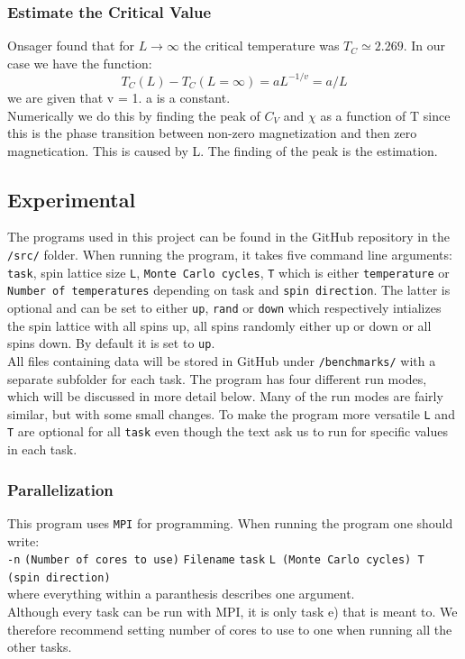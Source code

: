 \documentclass{article}
\begin{document}
\subsubsection*{Estimate the Critical Value}
Onsager found that for $L \rightarrow \infty$ the critical temperature was $T_C \simeq 2.269$. In our case we have the function:
\begin{equation}
T_C(L) - T_C(L = \infty) = aL^{-1/v} = a/L
\end{equation}
we are given that v = 1. a is a constant. \\
Numerically we do this by finding the peak of $C_V$ and $\chi$ as a function of T since this is the phase transition between non-zero magnetization and then zero magnetication. This is caused by L. The finding of the peak is the estimation.
\subsection*{Experimental}
The programs used in this project can be found in the GitHub repository \cite{github} in the \texttt{/src/} folder. When running the program, it takes five command line arguments: \texttt{task}, spin lattice size \texttt{L}, \texttt{Monte Carlo cycles}, \texttt{T} which is either \texttt{temperature} or \texttt{Number of temperatures} depending on task and \texttt{spin direction}. The latter is optional and can be set to either \texttt{up}, \texttt{rand} or \texttt{down} which respectively intializes the spin lattice with all spins up, all spins randomly either up or down or all spins down. By default it is set to \texttt{up}. \\
All files containing data will be stored in GitHub under \texttt{/benchmarks/} with a separate subfolder for each task. The program has four different run modes, which will be discussed in more detail below. Many of the run modes are fairly similar, but with some small changes. To make the program more versatile \texttt{L} and \texttt{T} are optional for all \texttt{task} even though the text \cite{Project} ask us to run for specific values in each task.
\subsubsection*{Parallelization}
This program uses \texttt{MPI} for programming. When running the program one should write: \\ 
\texttt{-n} \texttt{(Number of cores to use)} \texttt{Filename} \texttt{task} \texttt{L (Monte Carlo cycles) T (spin direction)} \\
where everything within a paranthesis describes one argument. \\
Although every task can be run with MPI, it is only task e) that is meant to. We therefore recommend setting number of cores to use to one when running all the other tasks.
\end{document}
